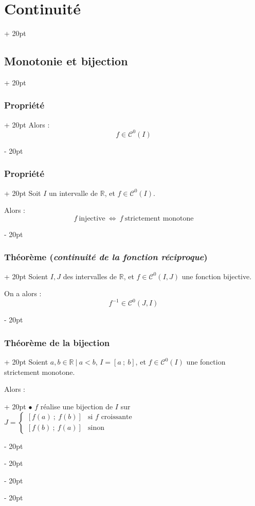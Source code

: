 \documentclass[a4paper, 12pt, twoside]{article}
\newcommand{\R}{\mathbb{R}} %
\newcommand{\seg}[2]{\left[ #1\ ;\ #2 \right]}
\newcommand{\ssi}{\ \Leftrightarrow \ }
\newcommand{\ind}[1][20pt]{\advance\leftskip + #1}
\newcommand{\deind}[1][20pt]{\advance\leftskip - #1}
\newenvironment{indt}[2][20pt]{#2 \par \ind[#1]}{\par \deind} %
\begin{document}
\begin{indt}{\section{Continuité}}
\begin{indt}{\subsection{Monotonie et bijection}}
\begin{indt}{\subsubsection{Propriété}}
                Alors :
                \[
                    f \in \mathcal C^0(I)
                \]
            \end{indt}

            \vspace{12pt}
            
            \begin{indt}{\subsubsection{Propriété}}
                Soit $I$ un intervalle de $\R$, et $f \in \mathcal C^0(I)$.

                Alors :
                \[
                    f\ \text{injective} \ssi f\ \text{strictement monotone}
                \]
            \end{indt}

            \vspace{12pt}
            
            \begin{indt}{\subsubsection{Théorème (\textit{continuité de la fonction réciproque})}}
                Soient $I, J$ des intervalles de $\R$, et $f \in \mathcal C^0(I, J)$ une fonction bijective.

                On a alors :
                \[
                    f^{-1} \in \mathcal C^0(J, I)
                \]
            \end{indt}

            \vspace{12pt}
            
            \begin{indt}{\subsubsection{Théorème de la bijection}}
                Soient $a, b \in \R\ |\ a < b$, $I = \seg a b$, et $f \in \mathcal C^0(I)$ une fonction strictement monotone.

                \begin{indt}{Alors :}
                    $\bullet$ $f$ réalise une bijection de $I$ sur
                    $
                        J = 
                        \begin{cases}
                            \seg{f(a)}{f(b)}
                            & \text{si $f$ croissante}
                            \\
                            \seg{f(b)}{f(a)}
                            & \text{sinon}
                        \end{cases}
                    $


\end{indt}
\end{indt}
\end{indt}
\end{indt}
\end{document}
